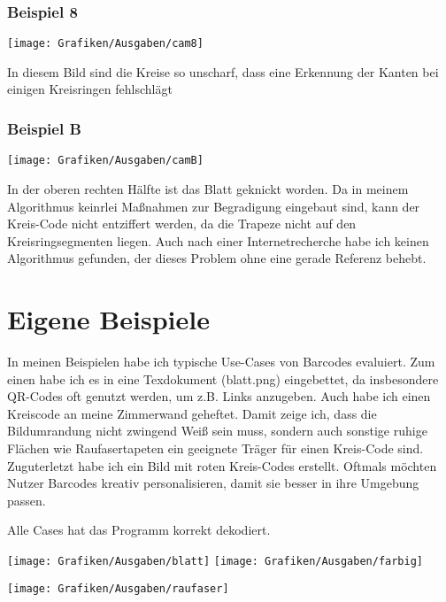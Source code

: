 \subsubsection{Beispiel 8}
\begin{minipage}{0.7\textwidth}
\texttt{[image: Grafiken/Ausgaben/cam8]}
\end{minipage}
\begin{minipage}{0.3\textwidth}
In diesem Bild sind die Kreise so unscharf, dass eine Erkennung der Kanten bei einigen Kreisringen fehlschlägt
\end{minipage}

\subsubsection{Beispiel B}
\begin{minipage}{0.7\textwidth}
\texttt{[image: Grafiken/Ausgaben/camB]}
\end{minipage}
\begin{minipage}{0.3\textwidth}
In der oberen rechten Hälfte ist das Blatt geknickt worden. Da in meinem Algorithmus keinrlei Maßnahmen zur Begradigung eingebaut sind, kann der Kreis-Code nicht entziffert werden, da die Trapeze nicht auf den Kreisringsegmenten liegen. Auch nach einer Internetrecherche habe ich keinen Algorithmus gefunden, der dieses Problem ohne eine gerade Referenz behebt.
\end{minipage}

\section{Eigene Beispiele}
In meinen Beispielen habe ich typische Use-Cases von Barcodes evaluiert. Zum einen habe ich es in eine Texdokument (blatt.png) eingebettet, da insbesondere QR-Codes oft genutzt werden, um z.B. Links anzugeben.
Auch habe ich einen Kreiscode an meine Zimmerwand geheftet. Damit zeige ich, dass die Bildumrandung nicht zwingend Weiß sein muss, sondern auch sonstige ruhige Flächen wie Raufasertapeten ein geeignete Träger für einen Kreis-Code sind.
Zuguterletzt habe ich ein Bild mit roten Kreis-Codes erstellt. Oftmals möchten Nutzer Barcodes kreativ personalisieren, damit sie besser in ihre Umgebung passen.

Alle Cases hat das Programm korrekt dekodiert.

\begin{center}
\texttt{[image: Grafiken/Ausgaben/blatt]}
\hspace{1em}
\texttt{[image: Grafiken/Ausgaben/farbig]}
\end{center}
\begin{center}
\texttt{[image: Grafiken/Ausgaben/raufaser]}
\end{center}

